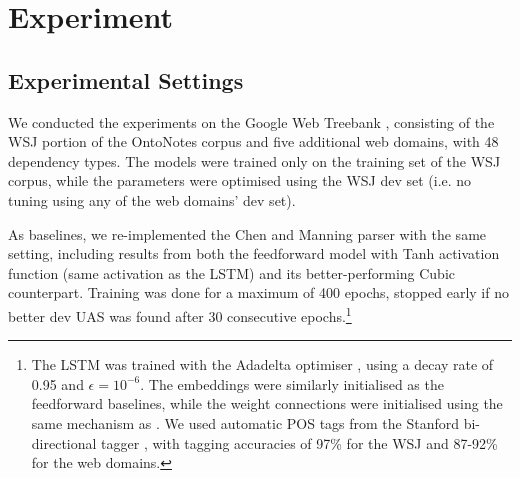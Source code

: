 \section{Experiment}
\subsection{Experimental Settings} \label{exp_settings_large}
We conducted the experiments on the Google Web Treebank \cite{PM12}, consisting of the WSJ portion of the OntoNotes corpus and five additional web domains, with 48 dependency types. The models were trained only on the training set of the WSJ corpus, while the parameters were optimised using the WSJ dev set (i.e. no tuning using any of the web domains' dev set).


As baselines, we re-implemented the Chen and Manning parser with the same setting, including results from both the feedforward model with Tanh activation function (same activation as the LSTM) and its better-performing Cubic counterpart. %
Training was done for a maximum of 400 epochs, stopped early if no better dev UAS was found after 30 consecutive epochs.\footnote{The LSTM was trained with the Adadelta optimiser \cite{Z12}, using a decay rate of 0.95 and $\epsilon=10^{-6}$. The embeddings were similarly initialised as the feedforward baselines, while the weight connections were initialised using the same mechanism as .
We used automatic POS tags from the Stanford bi-directional tagger \cite{Tet03}, with tagging accuracies of 97\% for the WSJ and 87-92\% for the web domains.} 


